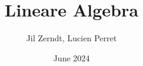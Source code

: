 \documentclass[a4paper, fontsize = 8pt, landscape]{scrartcl}
\title{Lineare Algebra}
\author{Jil Zerndt, Lucien Perret}
\date{June 2024}
\begin{document}
\begin{multicols*}{3}
    \thispagestyle{TitlePageStyle}
		\maketitle
    
    \raggedcolumns
    \newpage
    
    \raggedcolumns
    \newpage
    
    \raggedcolumns
    \newpage
    
    \raggedcolumns
    \newpage
    
    \raggedcolumns
    \newpage
    
    \raggedcolumns
    \newpage
    
    \raggedcolumns
    

\end{multicols*}
\end{document}
